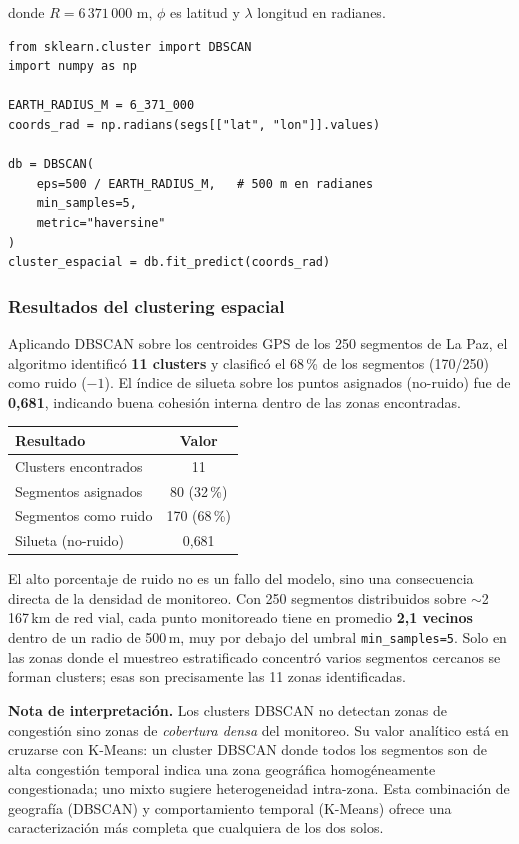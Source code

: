 \documentclass[12pt,a4paper]{article}
\begin{document}
donde $R = 6\,371\,000$ m, $\phi$ es latitud y $\lambda$ longitud en radianes.

\begin{lstlisting}[caption={DBSCAN haversine con sklearn.}]
from sklearn.cluster import DBSCAN
import numpy as np

EARTH_RADIUS_M = 6_371_000
coords_rad = np.radians(segs[["lat", "lon"]].values)

db = DBSCAN(
    eps=500 / EARTH_RADIUS_M,   # 500 m en radianes
    min_samples=5,
    metric="haversine"
)
cluster_espacial = db.fit_predict(coords_rad)
\end{lstlisting}

\subsubsection{Resultados del clustering espacial}

Aplicando DBSCAN sobre los centroides GPS de los 250 segmentos de La Paz,
el algoritmo identificó \textbf{11 clusters} y clasificó el 68\,\% de los
segmentos (170/250) como ruido ($-1$).
El índice de silueta sobre los puntos asignados (no-ruido) fue de
\textbf{0{,}681}, indicando buena cohesión interna dentro de las zonas
encontradas.

\begin{center}
\begin{tabular}{lc}
  \toprule
  Resultado & Valor \\
  \midrule
  Clusters encontrados     & 11 \\
  Segmentos asignados      & 80 (32\,\%) \\
  Segmentos como ruido     & 170 (68\,\%) \\
  Silueta (no-ruido)       & 0{,}681 \\
  \bottomrule
\end{tabular}
\end{center}

El alto porcentaje de ruido no es un fallo del modelo, sino una consecuencia
directa de la densidad de monitoreo.
Con 250 segmentos distribuidos sobre $\sim$2\,167\,km de red vial,
cada punto monitoreado tiene en promedio \textbf{2{,}1 vecinos} dentro de
un radio de 500\,m, muy por debajo del umbral \texttt{min\_samples=5}.
Solo en las zonas donde el muestreo estratificado concentró varios segmentos
cercanos se forman clusters; esas son precisamente las 11 zonas identificadas.

\medskip
\noindent\textbf{Nota de interpretación.}
Los clusters DBSCAN no detectan zonas de congestión sino zonas de
\emph{cobertura densa} del monitoreo.
Su valor analítico está en cruzarse con K-Means: un cluster DBSCAN donde
todos los segmentos son de alta congestión temporal indica una zona
geográfica homogéneamente congestionada; uno mixto sugiere heterogeneidad
intra-zona.
Esta combinación de geografía (DBSCAN) y comportamiento temporal (K-Means)
ofrece una caracterización más completa que cualquiera de los dos solos.
\end{document}

